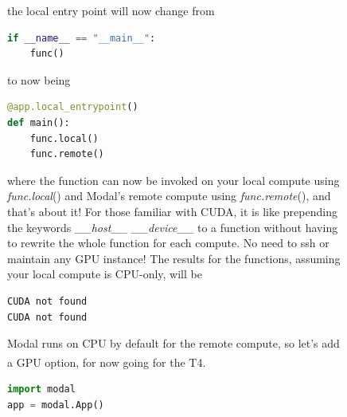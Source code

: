 \documentclass[12pt]{article}
\newcommand{\sidecite}[1]{\textsuperscript{\textcolor{blue}{\textbf{\scriptsize#1}}}}
\newcommand{\maincitecount}{\sidecite{\stepcounter{maincite}\themaincite}}
\begin{document}
\pagebreak
\begin{figure}[!htb]
    \begin{minipage}[t]{0.65\textwidth}
the local entry point will now change from 
\begin{lstlisting}[language=python,style=python,basicstyle=\ttfamily\footnotesize]
if __name__ == "__main__":
    func()
\end{lstlisting}
to now being
\begin{lstlisting}[language=python,style=python,basicstyle=\ttfamily\footnotesize]
@app.local_entrypoint()
def main():
    func.local()
    func.remote()
\end{lstlisting}
where the function can now be invoked on your local compute using
{\it func.local}() and Modal's remote compute using {\it func.remote}(),
and that's about it! For those familiar with CUDA, it is like prepending 
the keywords {\it \_\_host\_\_ \_\_device\_\_} to a function without having to 
rewrite the whole function for each compute. No need to ssh or maintain any GPU instance! 
The results for the functions, assuming your local compute is CPU-only, 
will be 
\begin{lstlisting}[language=bash,basicstyle=\ttfamily\footnotesize]
CUDA not found
CUDA not found
\end{lstlisting}
Modal runs on CPU by default for the remote compute, so let's add a GPU option{\maincitecount}, for now going for the T4.
\begin{lstlisting}[language=python,style=python,basicstyle=\ttfamily\footnotesize]
import modal 
app = modal.App()


\end{lstlisting}
\end{minipage}
\end{figure}
\end{document}
